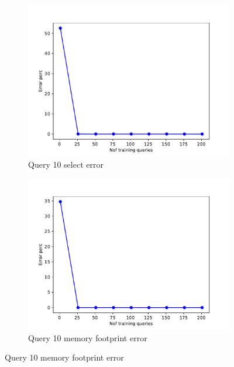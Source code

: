 \begin{figure}[!htb]

  \begin{subfigure}[t]{0.5\textwidth}
    \includegraphics[scale=0.4]{figs/tpch10/tpch10_sel10_error.pdf}
    \caption{Query 10 select error}
    \label{fig:tpch_sel10}
  \end{subfigure}
  \begin{subfigure}[t]{0.5\textwidth}
    \includegraphics[scale=0.4]{figs/tpch10/tpch10_q10_memerror.pdf}
    \caption{Query 10 memory footprint error}
    \label{fig:tpch_mem10}
  \end{subfigure}


\end{figure}
